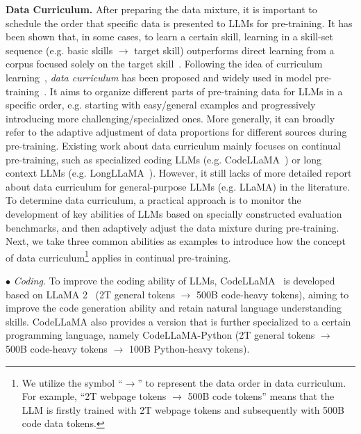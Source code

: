{\textbf{Data Curriculum.} After preparing the data mixture, it is important to schedule the order that specific data is presented to LLMs for pre-training. It has been shown that, in some cases, to learn a certain skill, learning in a skill-set sequence (e.g. basic skills $\rightarrow$ target skill) outperforms direct learning from a corpus focused solely on the target skill~\cite{Chen-2023-arXiv-skill,Roziere-arxiv-2023-codellama}. Following the idea of curriculum learning~\cite{Bengio-2009-arXiv-curriculum}, \emph{data curriculum} has been proposed and widely used in model pre-training~\cite{Chen-2023-arXiv-skill,Xu-2023-arXiv-contrastive,Roziere-arxiv-2023-codellama,Tworkowski-arxiv-2023-Focused}. It aims to  organize different parts of pre-training data for LLMs in a specific order, e.g. starting  with easy/general examples and progressively introducing  more challenging/specialized ones. More generally, it can broadly refer to the adaptive adjustment of data proportions for different sources during pre-training. Existing work about  data curriculum mainly focuses on continual pre-training, such as specialized coding LLMs (e.g. CodeLLaMA~\cite{Roziere-arxiv-2023-codellama}) or long context LLMs (e.g. LongLLaMA~\cite{Tworkowski-arxiv-2023-Focused}). However, it still lacks of more detailed report about data curriculum for general-purpose LLMs (e.g. LLaMA) in the literature. To determine data curriculum, a practical approach is to monitor the development of key abilities of LLMs based on specially constructed evaluation benchmarks, and then adaptively adjust the data mixture during pre-training. Next, we take  three common abilities as examples to introduce how the concept of data curriculum\footnote{We utilize the symbol ``$\rightarrow$'' to represent the data order  in  data curriculum. For example, ``2T webpage  tokens $\rightarrow$ 500B code tokens'' means that the LLM is firstly trained with 2T webpage tokens and subsequently with 500B code data tokens. } applies in continual pre-training. 

$\bullet$ \emph{Coding}. To improve the coding ability of LLMs, CodeLLaMA~\cite{Roziere-arxiv-2023-codellama} is developed based on LLaMA 2~\cite{Touvron-2023-llama2-arxiv} (2T general tokens $\rightarrow$ 500B code-heavy tokens), aiming to improve the code generation ability and retain natural language understanding skills.   CodeLLaMA also provides a version that is further specialized to a certain programming language, namely CodeLLaMA-Python (2T general tokens $\rightarrow$ 500B code-heavy tokens $\rightarrow$ 100B Python-heavy tokens).

}
